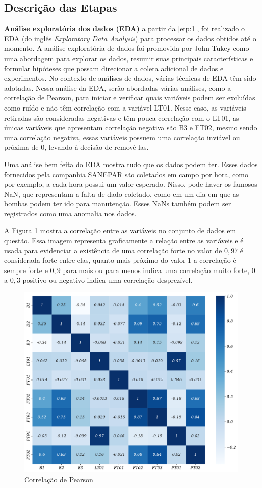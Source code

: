\subsection{Descri\c c\~ao das Etapas}

\textbf{An\'alise explorat\'oria dos dados (EDA)}
a partir da \ref{etp:1}, foi realizado o EDA (do inglês \textit{Exploratory Data Analysis}) para processar os dados obtidos até o momento. A análise exploratória de dados foi promovida por John Tukey \cite{Bandara2021} como uma abordagem para explorar os dados, resumir suas principais características e formular hipóteses que possam direcionar a coleta adicional de dados e experimentos. No contexto de análises de dados, várias técnicas de EDA têm sido adotadas.
Nessa análise da EDA, serão abordadas várias análises, como a correlação de Pearson, para iniciar e verificar quais variáveis podem ser excluídas como ruído e não têm correlação com a variável LT01. Nesse caso, as variáveis retiradas são consideradas negativas e têm pouca correlação com o LT01, as únicas variáveis que apresentam correlação negativa são B3 e FT02, mesmo sendo uma correlação negativa, essas variáveis possuem uma correlação inviável ou próxima de $0$, levando à decisão de removê-las.

Uma análise bem feita do EDA mostra tudo que os dados podem ter. Esses dados fornecidos pela companhia SANEPAR são coletados em campo por hora, como por exemplo, a cada hora possui um valor esperado. Nisso, pode haver os famosos NaN, que representam a falta de dado coletado, como em um dia em que as bombas podem ter ido para manutenção. Esses NaNs também podem ser registrados como uma anomalia nos dados.

A Figura \ref{fig:person} mostra a correlação entre as variáveis no conjunto de dados em questão. Essa imagem representa graficamente a relação entre as variáveis e é usada para evidenciar a existência de uma correlação forte no valor de $0,97$ é considerada forte entre elas, quanto mais próximo do valor $1$ a correlação é sempre forte e $0,9$ para mais ou para menos indica uma correlação muito forte, 0 a $0,3$ positivo ou negativo indica uma correlação desprezível.

\begin{figure}[!htb]
	\centering
	\caption{Correlação de Pearson}
	\label{fig:person}
	\includegraphics[width=0.7\linewidth]{Resultados/Figuras/person}
	
	
\end{figure}


